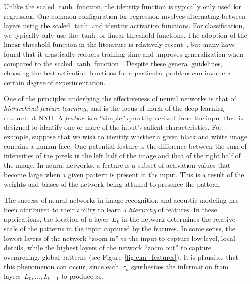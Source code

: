 \documentclass[11pt,a4paper]{article}
\numberwithin{equation}{section}
\begin{document}
Unlike the scaled $\tanh$ function, the identity function is typically only used
for regression. One common configuration for regression involves alternating
between layers using the scaled $\tanh$ and identity activation functions. For
classification, we typically only use the $\tanh$ or linear threshold functions.
The adoption of the linear threshold function in the literature is relatively
recent~\citep{nair2010rectified}, but many have found that it drastically
reduces training time and improves generalization when compared to the scaled
$\tanh$ function~\citep{krizhevsky2012imagenet}. Despite these general
guidelines, choosing the best activation functions for a particular problem can
involve a certain degree of experimentation.

One of the principles underlying the effectiveness of neural networks is that of
\emph{hierarchical feature learning}, and is the focus of much of the deep
learning research at NYU. A \emph{feature} is a ``simple'' quantity derived from
the input that is designed to identify one or more of the input's salient
characteristics. For example, suppose that we wish to identify whether a given
black and white image contains a human face. One potential feature is the
difference between the sum of intensities of the pixels in the left half of the
image and that of the right half of the image. In neural networks, a feature is
a subset of activation values that become large when a given pattern is present
in the input. This is a result of the weights and biases of the network being
attuned to presence the pattern.

The success of neural networks in image recognition and acoustic modeling has
been attributed to their ability to learn a \emph{hierarchy} of features. In
these applications, the location of a layer~$L_k$ in the network determines the
relative scale of the patterns in the input captured by the features. In some
sense, the lowest layers of the network ``zoom in'' to the input to capture
low-level, local details, while the highest layers of the network ``zoom out''
to capture overarching, global patterns (see Figure~\ref{fig:cnn_features}). It
is plausible that this phenomenon can occur, since each~$\sigma_k$ synthesizes
the information from layers~$L_0, \ldots, L_{k - 1}$ to produce $z_k$.

\end{document}
